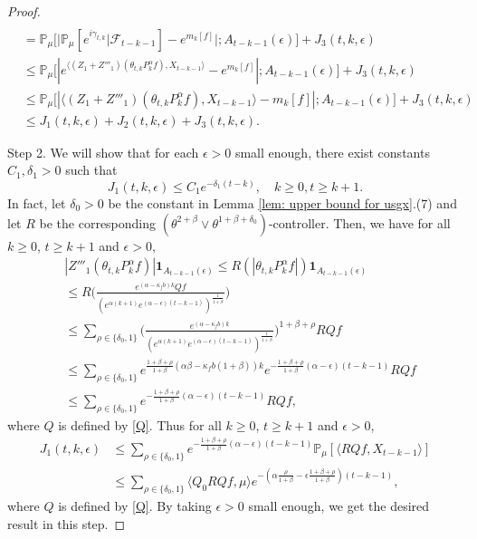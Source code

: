 \documentclass[12pt,a4paper]{amsart}
\theoremstyle{plain}
\theoremstyle{definition}
\numberwithin{equation}{section}
\begin{document}
\begin{proof}
\begin{align}
    \\& = \mathbb{P}_{\mu}\Big[ \big|\mathbb{P}_{\mu}[e^{i\gamma_{t,k}}| \mathscr F_{t-k-1}]-e^{m_k[f]}\big|;A_{t-k-1}(\epsilon)\Big] + J_3(t,k,\epsilon)
    \\& \leq \mathbb{P}_{\mu}\big[|e^{\langle (Z_1+Z'''_1) (\theta_{t,k}P^\alpha_k f),X_{t-k-1}\rangle}-e^{m_k[f]}|;A_{t-k-1}(\epsilon)\big]+  J_3(t,k,\epsilon)
    \\& \leq \mathbb{P}_{\mu}\big[|\langle (Z_1+Z'''_1)(\theta_{t,k}P^\alpha_k f),X_{t-k-1}\rangle-m_k[f]|;A_{t-k-1}(\epsilon)\big]+  J_3(t,k,\epsilon)
    \\&\leq J_1(t,k,\epsilon) + J_2(t,k,\epsilon)+J_3(t,k,\epsilon).
\end{align}

Step 2. We will show that for each $\epsilon>0$ small enough, there exist constants $C_1, \delta_1>0$ such that
\begin{equation}
\label{lemma31q}
    J_1(t,k,\epsilon)
    \leq C_1e^{-\delta_1 (t-k)},
    \quad k\geq 0, t\geq k+1.
\end{equation}
    In fact, let $\delta_0 >0$ be the constant in Lemma \ref{lem: upper bound for usgx}.(7) and let $R$ be the corresponding $(\theta^{2+\beta}\vee \theta^{1+\beta+\delta_0})$-controller.
    Then, we have for all $k\geq 0$, $t\geq k+1$ and $\epsilon> 0$,
\begin{align}
    & |Z'''_1(\theta_{t,k}P^\alpha_k f)|\mathbf{1}_{A_{t-k-1}(\epsilon)}
    \leq R(|\theta_{t,k}P^\alpha_k f|)\mathbf{1}_{A_{t-k-1}(\epsilon)}
    \\&\leq R \Big(\frac{e^{(\alpha-\kappa_fb)k} Qf}{(e^{\alpha (k+1)}e^{(\alpha-\epsilon)(t-k-1)})^\frac{1}{1+\beta}}\Big)
    \\&\leq \sum_{\rho \in \{\delta_0, 1\}}\Big(\frac{e^{(\alpha-\kappa_fb)k}}{(e^{\alpha (k+1)}e^{(\alpha-\epsilon)(t-k-1)})^\frac{1}{1+\beta}}\Big)^{1+\beta+ \rho} RQf
    \\&\leq\sum_{\rho \in \{\delta_0, 1\}}e^{\frac{1+\beta + \rho}{1+\beta}(\alpha\beta-\kappa_fb(1+\beta))k}e^{-\frac{1+\beta+\rho}{1+\beta} (\alpha-\epsilon)(t-k-1)}RQf
    \\&\leq \sum_{\rho \in \{\delta_0,1\}}e^{-\frac{1+\beta+\rho}{1+\beta}(\alpha-\epsilon)(t-k-1)}RQf,
\end{align}
    where $Q$ is defined by \eqref{Q}.
    Thus for all $k\geq 0$, $t\geq k+1$ and $\epsilon> 0$,
\begin{align}
\label{eq: estimate of J1}
    J_1(t,k,\epsilon)&
    \leq \sum_{\rho \in \{\delta_0,1\}}e^{-\frac{1+\beta+\rho}{1+\beta}(\alpha-\epsilon)(t-k-1)}\mathbb{P}_{\mu}[\langle RQf,X_{t-k-1}\rangle]\\
    & \leq \sum_{\rho \in \{\delta_0,1\}} \langle Q_0 RQf, \mu \rangle e^{-(\alpha\frac{\rho}{1+\beta}-\epsilon\frac{1+\beta+\rho}{1+\beta})(t-k-1)},
\end{align}
    where $Q$ is defined by \eqref{Q}.
    By taking $\epsilon>0$ small enough, we get the desired result in this step.


\end{proof}
\end{document}
